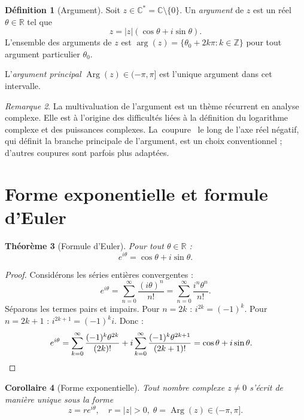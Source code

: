 \documentclass[12pt,a4paper,openany]{book}
\theoremstyle{definition}
\newtheorem{definition}{Définition}[chapter]
\theoremstyle{plain}
\newtheorem{theoreme}[definition]{Théorème}
\newtheorem{corollaire}[definition]{Corollaire}
\theoremstyle{remark}
\newtheorem{remarque}[definition]{Remarque}
\newcommand{\C}{\mathbb{C}}
\newcommand{\R}{\mathbb{R}}
\newcommand{\Z}{\mathbb{Z}}
\DeclareMathOperator{\Arg}{Arg}
\newcommand{\abs}[1]{\left|#1\right|}
\providecommand{\og}{\guillemotleft\,}
\providecommand{\fg}{\,\guillemotright}
\begin{document}
\begin{definition}[Argument]\label{def:argument}
Soit $z \in \C^* = \C \setminus \{0\}$. Un \emph{argument} de $z$ est un réel $\theta \in \R$ tel que
\[
  z = \abs{z}(\cos\theta + i\sin\theta).
\]
L'ensemble des arguments de $z$ est $\arg(z) = \{\theta_0 + 2k\pi : k \in \Z\}$ pour tout argument particulier $\theta_0$.

L'\emph{argument principal} $\Arg(z) \in (-\pi, \pi]$ est l'unique argument dans cet intervalle.
\end{definition}

\begin{remarque}\label{rem:argument-multivaluation}
La multivaluation de l'argument est un thème récurrent en analyse complexe. Elle est à l'origine des difficultés liées à la définition du logarithme complexe et des puissances complexes. La \og coupure \fg{} le long de l'axe réel négatif, qui définit la branche principale de l'argument, est un choix conventionnel ; d'autres coupures sont parfois plus adaptées.
\end{remarque}

\section{Forme exponentielle et formule d'Euler}\label{sec:forme-exponentielle}

\begin{theoreme}[Formule d'Euler]\label{thm:euler}
Pour tout $\theta \in \R$ :
\[
  e^{i\theta} = \cos\theta + i\sin\theta.
\]
\end{theoreme}

\begin{proof}
Considérons les séries entières convergentes :
\[
  e^{i\theta} = \sum_{n=0}^{\infty} \frac{(i\theta)^n}{n!}
  = \sum_{n=0}^{\infty} \frac{i^n \theta^n}{n!}.
\]
Séparons les termes pairs et impairs. Pour $n = 2k$ : $i^{2k} = (-1)^k$. Pour $n = 2k+1$ : $i^{2k+1} = (-1)^k i$. Donc :
\begin{align*}
  e^{i\theta} &= \sum_{k=0}^{\infty} \frac{(-1)^k \theta^{2k}}{(2k)!} + i\sum_{k=0}^{\infty} \frac{(-1)^k \theta^{2k+1}}{(2k+1)!} = \cos\theta + i\sin\theta. \qedhere
\end{align*}
\end{proof}

\begin{corollaire}[Forme exponentielle]\label{cor:forme-expo}
Tout nombre complexe $z \neq 0$ s'écrit de manière unique sous la forme
\[
  z = r e^{i\theta}, \quad r = \abs{z} > 0,\; \theta = \Arg(z) \in (-\pi,\pi].
\]
\end{corollaire}
\end{document}
